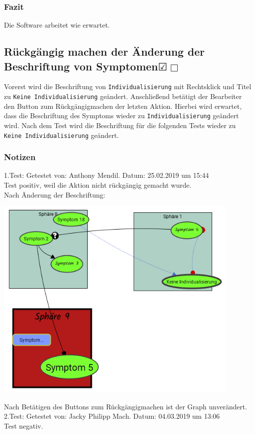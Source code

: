\documentclass[enabledeprecatedfontcommands]{scrartcl}
\newcommand{\subsectiont}[2]{\subsection[#1]{#1{\normalsize\normalfont #2}}}
\newcommand{\leer}{$\Box$}
\newcommand{\ok}{$\CheckedBox$}
\begin{document}
\subsubsection{Fazit}
Die Software arbeitet wie erwartet.

\subsectiont{Rückgängig machen der Änderung der \\Beschriftung von Symptomen}{\dotfill\XBox\ok\leer}
Vorerst wird die Beschriftung von \texttt{Individualisierung} mit Rechtsklick und Titel zu \texttt{Keine Individualisierung} geändert. Anschließend betätigt der Bearbeiter den Button zum Rückgängigmachen der letzten Aktion. Hierbei wird erwartet, dass die Beschriftung des Symptoms wieder zu \texttt{Individualisierung} geändert wird. Nach dem Test wird die Beschriftung für die folgenden Tests wieder zu \texttt{Keine Individualisierung} geändert.
\subsubsection{Notizen}
1.Test: Getestet von: Anthony Mendil. Datum: 25.02.2019 um 15:44 \\
Test positiv, weil die Aktion nicht rückgängig gemacht wurde. \\
Nach Änderung der Beschriftung: 
\begin{center}
\includegraphics[height=10cm]{3_48.PNG}
\end{center}
Nach Betätigen des Buttons zum Rückgängigmachen ist der Graph unverändert. \\
2.Test: Getestet von: Jacky Philipp Mach. Datum: 04.03.2019 um 13:06 \\
Test negativ.\\\\
\end{document}
